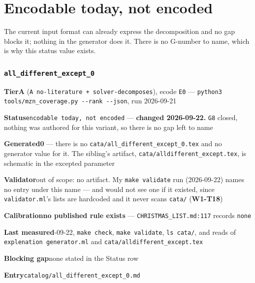 \documentclass[10pt,a4paper]{article}
\newcommand{\entryfield}[2]{{\raggedright\textbf{#1}\quad #2\par}}
\begin{document}
\section{Encodable today, not encoded}
The current input format can already express the decomposition and no gap blocks it; nothing in the generator does it. There is no G-number to name, which is why this status value exists.
\subsubsection*{\texttt{all\_\allowbreak{}different\_\allowbreak{}except\_\allowbreak{}0}}
\label{entry:all-different-except-0}
\entryfield{Tier}{\textbf{A} (\texttt{A no-\allowbreak{}literature + solver-\allowbreak{}decomposes}), ecode \texttt{E0} --- \texttt{python3 tools/\allowbreak{}mzn\_\allowbreak{}coverage.\allowbreak{}py -\allowbreak{}-\allowbreak{}rank -\allowbreak{}-\allowbreak{}json}, run 2026-09-21}
\entryfield{Status}{\texttt{encodable today, not encoded} --- \textbf{changed 2026-09-22.} \texttt{G8} closed, nothing was authored for this variant, so there is no gap left to name}
\entryfield{Generated}{\textbf{0} --- there is no \texttt{cata/\allowbreak{}all\_\allowbreak{}different\_\allowbreak{}except\_\allowbreak{}0.\allowbreak{}tex} and no generator value for it. The sibling's artifact, \texttt{cata/\allowbreak{}alldifferent\_\allowbreak{}except.\allowbreak{}tex}, is schematic in the excepted parameter}
\entryfield{Validator}{out of scope: no artifact. My \texttt{make validate} run (2026-09-22) names no entry under this name --- and would not see one if it existed, since \texttt{validator.ml}'s lists are hardcoded and it never scans \texttt{cata/} (\textbf{W1-T18})}
\entryfield{Calibration}{\textbf{no published rule exists} --- \texttt{CHRISTMAS\_LIST.md:117} records \texttt{none}}
\entryfield{Last measured}{2026-09-22, \texttt{make check}, \texttt{make validate}, \texttt{ls cata/}, and reads of \texttt{explenation generator.ml} and \texttt{cata/\allowbreak{}alldifferent\_\allowbreak{}except.\allowbreak{}tex}}
\entryfield{Blocking gap}{none stated in the Status row}
\entryfield{Entry}{\texttt{catalog/all\_different\_except\_0.md}}
\end{document}
